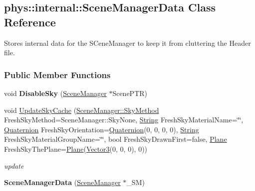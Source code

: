 \hypertarget{classphys_1_1internal_1_1SceneManagerData}{
\subsection{phys::internal::SceneManagerData Class Reference}
\label{classphys_1_1internal_1_1SceneManagerData}
}


Stores internal data for the SCeneManager to keep it from cluttering the Header file.  


\subsubsection*{Public Member Functions}
\begin{DoxyCompactItemize}
\item 
\hypertarget{classphys_1_1internal_1_1SceneManagerData_a40d62405f637531b7fd19b6c176c5a50}{
void {\bfseries DisableSky} (\hyperlink{classphys_1_1SceneManager}{SceneManager} $\ast$ScenePTR)}
\label{classphys_1_1internal_1_1SceneManagerData_a40d62405f637531b7fd19b6c176c5a50}

\item 
\hypertarget{classphys_1_1internal_1_1SceneManagerData_a0e4db14de622e028e5bea383d37099ed}{
void \hyperlink{classphys_1_1internal_1_1SceneManagerData_a0e4db14de622e028e5bea383d37099ed}{UpdateSkyCache} (\hyperlink{classphys_1_1SceneManager_a91dd086aabaab926d070c65fc14828d6}{SceneManager::SkyMethod} FreshSkyMethod=SceneManager::SkyNone, \hyperlink{namespacephys_aa03900411993de7fbfec4789bc1d392e}{String} FreshSkyMaterialName=\char`\"{}\char`\"{}, \hyperlink{classphys_1_1Quaternion}{Quaternion} FreshSkyOrientation=\hyperlink{classphys_1_1Quaternion}{Quaternion}(0, 0, 0, 0), \hyperlink{namespacephys_aa03900411993de7fbfec4789bc1d392e}{String} FreshSkyMaterialGroupName=\char`\"{}\char`\"{}, bool FreshSkyDrawnFirst=false, \hyperlink{classphys_1_1Plane}{Plane} FreshSkyThePlane=\hyperlink{classphys_1_1Plane}{Plane}(\hyperlink{classphys_1_1Vector3}{Vector3}(0, 0, 0), 0))}
\label{classphys_1_1internal_1_1SceneManagerData_a0e4db14de622e028e5bea383d37099ed}

\begin{DoxyCompactList}\small\item\em update \item\end{DoxyCompactList}\item 
\hypertarget{classphys_1_1internal_1_1SceneManagerData_aedd570da5bdb027ec976e3c29137474c}{
{\bfseries SceneManagerData} (\hyperlink{classphys_1_1SceneManager}{SceneManager} $\ast$\_\-SM)}
\label{classphys_1_1internal_1_1SceneManagerData_aedd570da5bdb027ec976e3c29137474c}

\end{DoxyCompactItemize}
